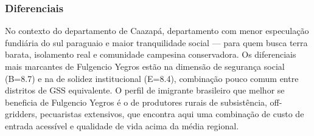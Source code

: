 \subsubsection*{Diferenciais}\label{dif-fulgencio-yegros-0605}
No contexto do departamento de Caazapá, departamento com menor especulação fundiária do sul paraguaio e maior tranquilidade social — para quem busca terra barata, isolamento real e comunidade campesina conservadora. Os diferenciais mais marcantes de Fulgencio Yegros estão na dimensão de segurança social (B=8.7) e na de solidez institucional (E=8.4), combinação pouco comum entre distritos de GSS equivalente. O perfil de imigrante brasileiro que melhor se beneficia de Fulgencio Yegros é o de produtores rurais de subsistência, off-gridders, pecuaristas extensivos, que encontra aqui uma combinação de custo de entrada acessível e qualidade de vida acima da média regional.
